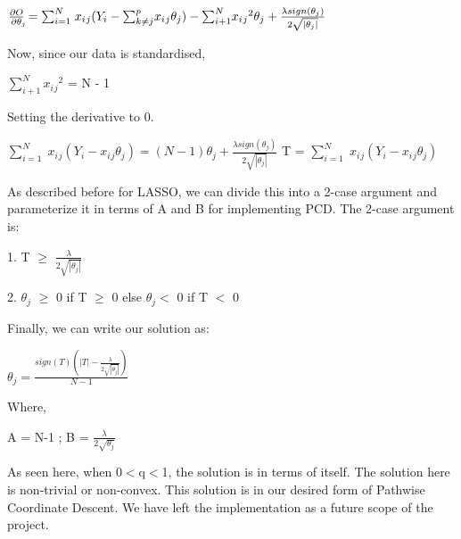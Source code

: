 \documentclass{article}
\begin{document}
$\frac{\partial O}{\partial \theta_{\rlap{$\scriptscriptstyle j$}}} = {\sum}_{i=1}^{N} \; x_i{_j}(Y_i - {\sum}_{k\neq j}^{p} x_i{_j}\theta_j) - {\sum}_{i+1}^{N} x_i{_j}^2\theta_j + \frac{\lambda sign(\theta_j)}{2 \sqrt{|\theta_j|}}$
\newline

Now, since our data is standardised, 
\newline

${\sum}_{i+1}^{N} x_i{_j}^2$ = N - 1
\newline

Setting the derivative to 0. 

\newline

${\sum}_{i=1}^{N} \; x_i{_j}(Y_i - x_i{_j}\theta_j) = (N-1)\theta_j + \frac{\lambda sign(\theta_j)}{2 \sqrt{|\theta_j|}}$
T = ${\sum}_{i=1}^{N} \; x_i{_j}(Y_i - x_i{_j}\theta_j)$
\newline

As described before for LASSO, we can divide this into a 2-case argument and parameterize it in terms of A and B for implementing PCD. 
\newline
The 2-case argument is:
\newline

1. T $\geq$ $ \frac{\lambda }{2 \sqrt{|\theta_j|}}$
\newline

2. $\theta_j$ $\geq$ 0 if T $\geq$ 0 else $\theta_j $$< $ 0 if T $<$ 0
\newline

Finally, we can write our solution as:
\newline

$\theta_j = \frac{sign(T)(|T|- \frac{\lambda}{2\sqrt{|\theta_j|}})}{N-1}
$
\newline

Where, 
\newline

A = N-1 ; B = $\frac{\lambda}{2\sqrt{\theta_j}}$
\newline

As seen here, when 0$<$q$<$1, the solution is in terms of itself. The solution here is non-trivial or non-convex. This solution is in our desired form of Pathwise Coordinate Descent. We have left the implementation as a future scope of the project.  
\end{document}
